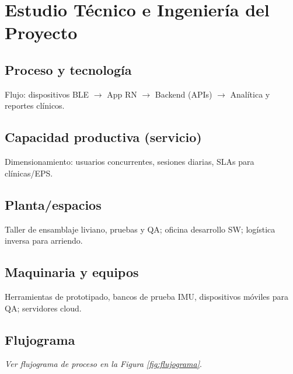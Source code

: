\section{Estudio Técnico e Ingeniería del Proyecto}
\subsection{Proceso y tecnología}
Flujo: dispositivos BLE $\rightarrow$ App RN $\rightarrow$ Backend (APIs) $\rightarrow$ Analítica y reportes clínicos. 
\subsection{Capacidad productiva (servicio)}
Dimensionamiento: usuarios concurrentes, sesiones diarias, SLAs para clínicas/EPS.

\subsection{Planta/espacios}
Taller de ensamblaje liviano, pruebas y QA; oficina desarrollo SW; logística inversa para arriendo.

\subsection{Maquinaria y equipos}
Herramientas de prototipado, bancos de prueba IMU, dispositivos móviles para QA; servidores cloud.

\subsection{Flujograma}
\emph{Ver flujograma de proceso en la Figura \ref{fig:flujograma}}.
